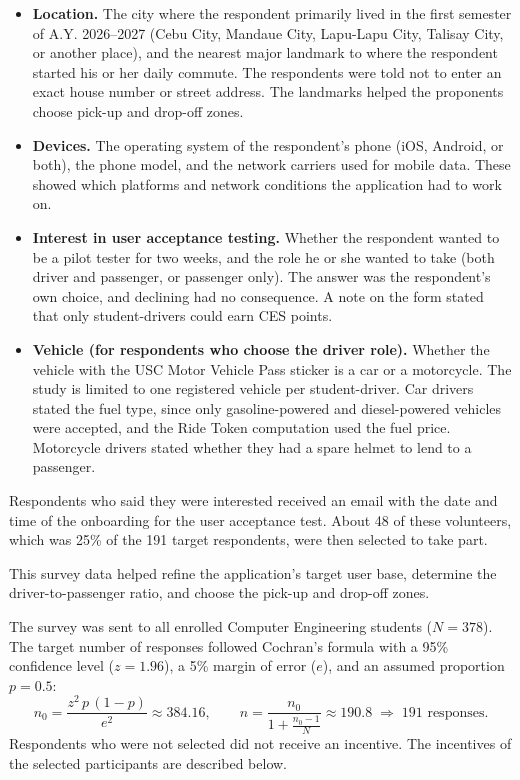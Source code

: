 \begin{itemize}
    \item \textbf{Location.} The city where the respondent primarily lived in the first semester of A.Y. 2026--2027 (Cebu City, Mandaue City, Lapu-Lapu City, Talisay City, or another place), and the nearest major landmark to where the respondent started his or her daily commute. The respondents were told not to enter an exact house number or street address. The landmarks helped the proponents choose pick-up and drop-off zones.
    \item \textbf{Devices.} The operating system of the respondent's phone (iOS, Android, or both), the phone model, and the network carriers used for mobile data. These showed which platforms and network conditions the application had to work on.
    \item \textbf{Interest in user acceptance testing.} Whether the respondent wanted to be a pilot tester for two weeks, and the role he or she wanted to take (both driver and passenger, or passenger only). The answer was the respondent's own choice, and declining had no consequence. A note on the form stated that only student-drivers could earn CES points.
    \item \textbf{Vehicle (for respondents who choose the driver role).} Whether the vehicle with the USC Motor Vehicle Pass sticker is a car or a motorcycle. The study is limited to one registered vehicle per student-driver. Car drivers stated the fuel type, since only gasoline-powered and diesel-powered vehicles were accepted, and the Ride Token computation used the fuel price. Motorcycle drivers stated whether they had a spare helmet to lend to a passenger.
\end{itemize}

Respondents who said they were interested received an email with the date and time of the onboarding for the user acceptance test. About 48 of these volunteers, which was 25\% of the 191 target respondents, were then selected to take part.

This survey data helped refine the application's target user base, determine the driver-to-passenger ratio, and choose the pick-up and drop-off zones.

The survey was sent to all enrolled Computer Engineering students ($N = 378$). The target number of responses followed Cochran's formula \cite{cochran1977} with a 95\% confidence level ($z = 1.96$), a 5\% margin of error ($e$), and an assumed proportion $p = 0.5$:
\begin{equation}
    n_0 = \frac{z^2\, p\,(1-p)}{e^2} \approx 384.16, \qquad
    n = \frac{n_0}{1 + \frac{n_0 - 1}{N}} \approx 190.8 \;\Rightarrow\; 191 \text{ responses.}
\end{equation}
Respondents who were not selected did not receive an incentive. The incentives of the selected participants are described below.

